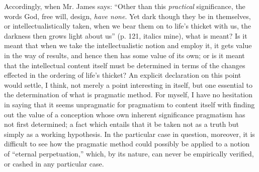 \documentclass[12pt]{article}
\begin{document}
Accordingly, when Mr. James says: ``Other than this \emph{practical}
significance, the words God, free will, design, \emph{have none}. Yet dark
though they be in themselves, or intellectualistically taken, when we
bear them on to life's thicket with us, the darkness then grows light
about us'' (p. 121, italics mine), what is meant? Is it meant that when
we take the intellectualistic notion and employ it, it gets value in
the way of results, and hence then has some value of its own; or is it
meant that the intellectual content itself must be determined in terms
of the changes effected in the ordering of life's thicket? An explicit
declaration on this point would settle, I think, not merely a point
interesting in itself, but one essential to the determination of what
is pragmatic method. For myself, I have no hesitation in saying that
it seems unpragmatic for pragmatism to content itself with finding out
the value of a conception whose own inherent significance pragmatism
has not first determined; a fact which entails that it be taken not as
a truth but simply as a working hypothesis. In the particular case in
question, moreover, it is difficult to see how the pragmatic method
could possibly be applied to a notion of ``eternal perpetuation,''
which, by its nature, can never be empirically verified, or cashed in
any particular case.
\end{document}

